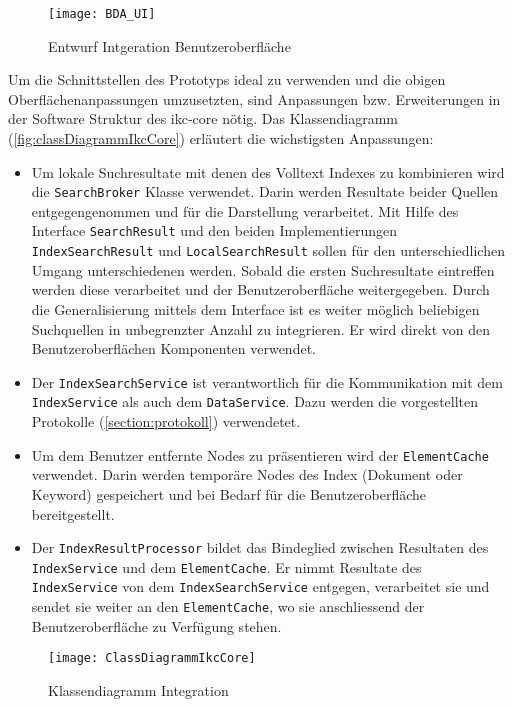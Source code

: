     \begin{figure}[H]
    \centering
    \texttt{[image: BDA\_UI]}
    \caption{Entwurf Intgeration Benutzeroberfläche}
    \label{fig:bda_ui}
    \end{figure}

Um die Schnittstellen des Prototyps ideal zu verwenden und die obigen Oberflächenanpassungen umzusetzten, sind Anpassungen bzw. Erweiterungen in der Software Struktur des \gls{ikc-core} nötig. Das Klassendiagramm (\autoref{fig:classDiagrammIkcCore}) erläutert die wichstigsten Anpassungen:

\begin{itemize}
    \item Um lokale Suchresultate mit denen des Volltext Indexes zu kombinieren wird die \texttt{SearchBroker} Klasse verwendet. Darin werden Resultate beider Quellen entgegengenommen und für die Darstellung verarbeitet. Mit Hilfe des Interface \texttt{SearchResult} und den beiden Implementierungen \texttt{IndexSearchResult} und \texttt{LocalSearchResult} sollen für den unterschiedlichen Umgang unterschiedenen werden. Sobald die ersten Suchresultate eintreffen werden diese verarbeitet und der Benutzeroberfläche weitergegeben. Durch die Generalisierung mittels dem Interface ist es weiter möglich beliebigen Suchquellen in unbegrenzter Anzahl zu integrieren. Er wird direkt von den Benutzeroberflächen Komponenten verwendet. 
    \item Der \texttt{IndexSearchService} ist verantwortlich für die Kommunikation mit dem \texttt{IndexService} als auch dem \texttt{DataService}. Dazu werden die vorgestellten Protokolle (\autoref{section:protokoll}) verwendetet.
    \item Um dem Benutzer entfernte Nodes zu präsentieren wird der \texttt{ElementCache} verwendet. Darin werden temporäre Nodes des Index (Dokument oder \gls{Keyword}) gespeichert und bei Bedarf für die Benutzeroberfläche bereitgestellt.
    \item Der \texttt{IndexResultProcessor} bildet das Bindeglied zwischen Resultaten des \texttt{IndexService} und dem \texttt{ElementCache}. Er nimmt Resultate des \texttt{IndexService} von dem \texttt{IndexSearchService} entgegen, verarbeitet sie und sendet sie weiter an den \texttt{ElementCache}, wo sie anschliessend der Benutzeroberfläche zu Verfügung stehen.

\end{itemize}


    \begin{figure}[H]
    \centering
    \texttt{[image: ClassDiagrammIkcCore]}
    \caption{Klassendiagramm Integration}
    \label{fig:classDiagrammIkcCore}
    \end{figure}


